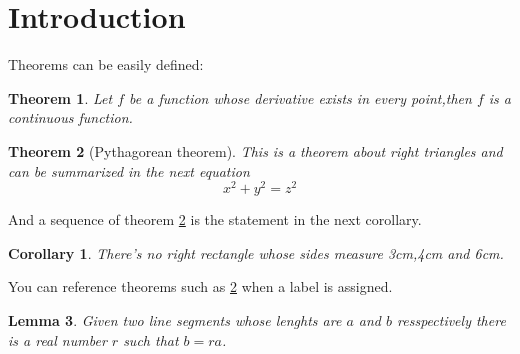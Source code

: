 \documentclass{article}
\newtheorem{theorem}{Theorem}[section]
\newtheorem{corollary}{Corollary}[theorem]
\newtheorem{lemma}[theorem]{Lemma}
\begin{document}
\section{Introduction}
Theorems can be easily defined:

\begin{theorem}
Let \(f\) be a function whose derivative exists in every point,then \(f\) is a continuous function.
\end{theorem}
\begin{theorem}[Pythagorean theorem]
\label{pythagorean}
This is a theorem about right triangles and can be summarized in the next equation
\[x^2+y^2=z^2 \]
\end{theorem}
And a sequence of theorem \ref{pythagorean} is the statement in the next corollary.
\begin{corollary}
There's no right rectangle whose sides  measure 3cm,4cm and 6cm.
\end{corollary}
You can reference theorems such as \ref{pythagorean} when a label is assigned.
\begin{lemma}
Given two line segments whose lenghts are \(a\) and \(b\) resspectively there is a real number \(r\) such that \(b=ra\).
\end{lemma}
\end{document}
